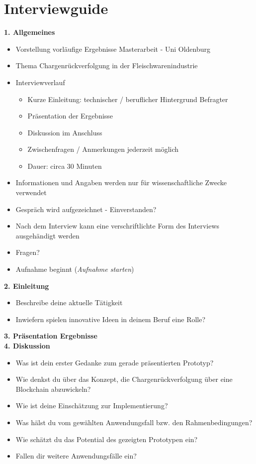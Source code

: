 \section{Interviewguide}
\footnotesize
\textbf{1. Allgemeines}
\begin{itemize}
  \item Vorstellung vorläufige Ergebnisse Masterarbeit - Uni Oldenburg
  \item Thema \glqq Chargenrückverfolgung in der Fleischwarenindustrie\grqq
  \item Interviewverlauf
  \begin{itemize}[nosep]
    \item Kurze Einleitung: technischer / beruflicher Hintergrund Befragter
    \item Präsentation der Ergebnisse
    \item Diskussion im Anschluss
    \item Zwischenfragen / Anmerkungen jederzeit möglich
    \item Dauer: circa 30 Minuten
  \end{itemize}
  \item Informationen und Angaben werden nur für wissenschaftliche Zwecke verwendet
  \item Gespräch wird aufgezeichnet - Einverstanden?
  \item Nach dem Interview kann eine verschriftlichte Form des Interviews ausgehändigt werden
  \item Fragen?
  \item Aufnahme beginnt (\textit{Aufnahme starten})
\end{itemize}

\noindent
\textbf{2. Einleitung}
\begin{itemize}
  \item Beschreibe deine aktuelle Tätigkeit
  \item Inwiefern spielen innovative Ideen in deinem Beruf eine Rolle?
\end{itemize}

\noindent
\textbf{3. Präsentation Ergebnisse}\\
\noindent
\textbf{4. Diskussion}
\begin{itemize}
  \item Was ist dein erster Gedanke zum gerade präsentierten Prototyp?
  \item Wie denkst du über das Konzept, die Chargenrückverfolgung über eine Blockchain abzuwickeln?
  \item Wie ist deine Einschätzung zur Implementierung?
  \item Was hälst du vom gewählten Anwendungsfall bzw. den Rahmenbedingungen?
  \item Wie schätzt du das Potential des gezeigten Prototypen ein?
  \item Fallen dir weitere Anwendungsfälle ein?
\end{itemize}

